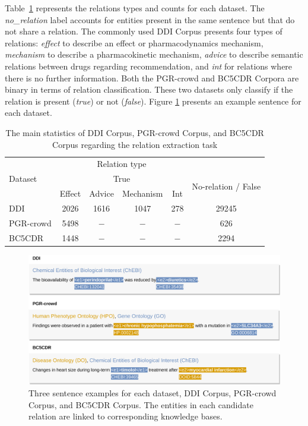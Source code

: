 Table~\ref{Tab:01} represents the relations types and counts for each dataset. The \textit{no\_relation} label accounts for entities present in the same sentence but that do not share a relation. The commonly used DDI Corpus presents four types of relations: \textit{effect} to describe an effect or pharmacodynamics mechanism, \textit{mechanism} to describe a pharmacokinetic mechanism, \textit{advice} to describe semantic relations between drugs regarding recommendation, and \textit{int} for relations where there is no further information. Both the PGR-crowd and BC5CDR Corpora are binary in terms of relation classification. These two datasets only classify if the relation is present (\textit{true}) or not (\textit{false}). Figure \ref{fig:52} presents an example sentence for each dataset. 

\begin{table}[h]
\centering
  \caption[Main Statistics of the Relation Extraction Corpora]{The main statistics of DDI Corpus, PGR-crowd Corpus, and BC5CDR Corpus
regarding the relation extraction task}
  \label{Tab:01}
\begin{tabular}{lccccc}
\hline 
\multirow{3}{*}{Dataset} & \multicolumn{4}{c}{Relation type} & \\\cline{2-6}
 & \multicolumn{4}{c}{True} & \multirow{2}{*}{No-relation / False}\\\cline{2-5}
 & Effect & Advice & Mechanism & Int &\\\hline
DDI & 2026 & 1616 & 1047 & 278 & 29245\\
PGR-crowd & 5498 & $-$ & $-$ & $-$ & 626\\
BC5CDR & 1448 & $-$ & $-$ & $-$ & 2294\\\hline
\end{tabular}
\end{table}

\begin{figure}[h]%
\centerline{\includegraphics[width=\linewidth]{images/chapter_5/example_sentences_each_dataset.png}}
\caption[Three Sentence Examples for each dataset, DDI Corpus, PGR-crowd Corpus, and BC5CDR Corpus]{Three sentence examples for each dataset, DDI Corpus, PGR-crowd Corpus, and BC5CDR Corpus. The entities in each candidate relation are linked to corresponding knowledge bases.}\label{fig:52}
\end{figure}

